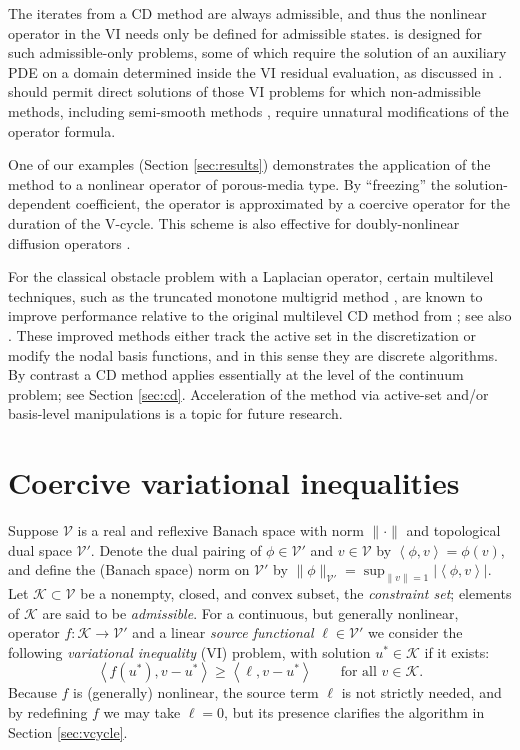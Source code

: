 \documentclass[letterpaper,final,12pt,reqno]{amsart}
\theoremstyle{cstyle}
\theoremstyle{cstyle*}
\theoremstyle{dstyle}
\numberwithin{equation}{section}
\numberwithin{figure}{section}
\numberwithin{table}{section}
\numberwithin{theorem}{section}
\newcommand{\cK}{\mathcal{K}}
\newcommand{\cV}{\mathcal{V}}
\newcommand{\ip}[2]{\left<#1,#2\right>}
\begin{document}
The iterates from a CD method are always admissible, and thus the nonlinear operator in the VI needs only be defined for admissible states.   is designed for such admissible-only problems, some of which require the solution of an auxiliary PDE on a domain determined inside the VI residual evaluation, as discussed in \cite{Bueler2021conservation}.   should permit direct solutions of those VI problems for which non-admissible methods, including semi-smooth methods \cite{BensonMunson2006}, require unnatural modifications of the operator formula.

One of our examples (Section \ref{sec:results}) demonstrates the application of the  method to a nonlinear operator of porous-media type.  By ``freezing'' the solution-dependent coefficient, the operator is approximated by a coercive operator for the duration of the V-cycle.  This scheme is also effective for doubly-nonlinear diffusion operators \cite[for example]{Bueler2021conservation,Calvoetal2002}.

For the classical obstacle problem with a Laplacian operator, certain multilevel techniques, such as the truncated monotone multigrid method \cite{Kornhuber1994}, are known to improve performance relative to the original multilevel CD method from \cite{Tai2003}; see also \cite{GraeserKornhuber2009}.  These improved methods either track the active set in the discretization or modify the nodal basis functions, and in this sense they are discrete algorithms.  By contrast a CD method applies essentially at the level of the continuum problem; see Section \ref{sec:cd}.  Acceleration of the  method via active-set and/or basis-level manipulations is a topic for future research.


\section{Coercive variational inequalities} \label{sec:vi}

Suppose $\cV$ is a real and reflexive Banach space with norm $\|\cdot\|$ and topological dual space $\cV'$.  Denote the dual pairing of $\phi \in \cV'$ and $v\in\cV$ by $\ip{\phi}{v} = \phi(v)$, and define the (Banach space) norm on $\cV'$ by $\|\phi\|_{\cV'} = \sup_{\|v\|=1} |\ip{\phi}{v}|$.  Let $\cK \subset \cV$ be a nonempty, closed, and convex subset, the \emph{constraint set}; elements of $\cK$ are said to be \emph{admissible}.  For a continuous, but generally nonlinear, operator $f:\cK \to \cV'$ and a linear \emph{source functional} $\ell\in \cV'$ we consider the following \emph{variational inequality} (VI) problem, with solution $u^*\in \cK$ if it exists:
\begin{equation}
\ip{f(u^*)}{v-u^*} \ge \ip{\ell}{v-u^*} \qquad \text{for all } v\in \cK. \label{eq:vi}
\end{equation}
Because $f$ is (generally) nonlinear, the source term $\ell$ is not strictly needed, and by redefining $f$ we may take $\ell=0$, but its presence clarifies the algorithm in Section \ref{sec:vcycle}.
\end{document}
